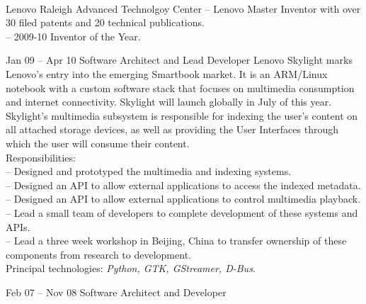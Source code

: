 \documentclass[letterpaper, 11pt]{article}
\begin{document}
    \begin{resume}
        \\[2ex]
        \begin{block}
            \begin{category}{Lenovo}
                 {Raleigh Advanced Technolgoy Center}
                -- Lenovo Master Inventor with over 30 filed patents and 20 technical publications. \\
                -- 2009-10 Inventor of the Year. \\
            \end{category}
            \begin{subcategory}{Jan 09 -- Apr 10}
                 {Software Architect and Lead Developer}
                Lenovo Skylight marks Lenovo's entry into the emerging Smartbook market.
                It is an ARM/Linux notebook with a custom software stack that focuses
                on multimedia consumption and internet connectivity.  Skylight will launch
                globally in July of this year.
                \\[1ex]
                Skylight's multimedia subsystem is responsible for indexing the user's content on all
                attached storage devices, as well as providing the User Interfaces through which
                the user will consume their content.
                \\[1ex]
                Responsibilities: \\
                -- Designed and prototyped the multimedia and indexing systems. \\
                -- Designed an API to allow external applications to access the indexed metadata. \\
                -- Designed an API to allow external applications to control multimedia playback. \\
                -- Lead a small team of developers to complete development of these systems and APIs. \\
                -- Lead a three week workshop in Beijing, China to transfer ownership of these components from research to development.
                \\[1ex]
                Principal technologies: \emph{Python, GTK, GStreamer, D-Bus}.
                \bigskip
            \end{subcategory}
            \begin{subcategory}{Feb 07 -- Nov 08}
                 {Software Architect and Developer}

\end{subcategory}
\end{block}
\end{resume}
\end{document}
